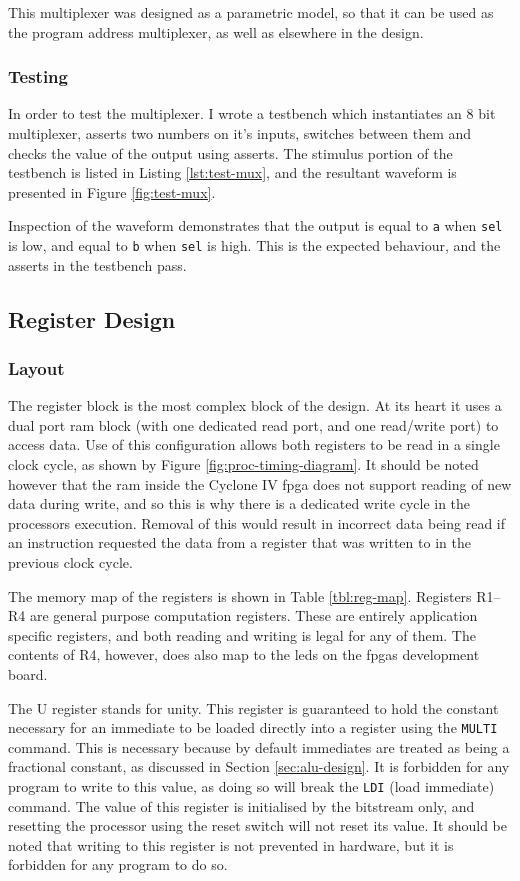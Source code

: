 This multiplexer was designed as a parametric model, so that it can be used as the program address multiplexer, as well as elsewhere in the design.


\subsubsection{Testing}
In order to test the multiplexer. I wrote a testbench which instantiates an $8$ bit multiplexer, asserts two numbers on it's inputs, switches between them and checks the value of the output using asserts. The stimulus portion of the testbench is listed in Listing \ref{lst:test-mux}, and the resultant waveform is presented in Figure \ref{fig:test-mux}.

Inspection of the waveform demonstrates that the output is equal to \texttt{a}  when \texttt{sel} is low, and equal to \texttt{b} when \texttt{sel} is high. This is the expected behaviour, and the asserts in the testbench pass.


\subsection{Register Design}
\subsubsection{Layout}

The register block is the most complex block of the design. At its heart it uses a dual port \gls{ram} block (with one dedicated read port, and one read/write port) to access data. Use of this configuration allows both registers to be read in a single clock cycle, as shown by Figure \ref{fig:proc-timing-diagram}. It should be noted however that the \gls{ram} inside the Cyclone IV \gls{fpga} does not support reading of new data during write, and so this is why there is a dedicated write cycle in the processors execution. Removal of this would result in incorrect data being read if an instruction requested the data from a register that was written to in the previous clock cycle.

The memory map of the registers is shown in Table \ref{tbl:reg-map}. Registers R1--R4 are general purpose computation registers. These are entirely application specific registers, and both reading and writing is legal for any of them. The contents of R4, however, does also map to the \glspl{led} on the \glspl{fpga} development board.

The U register stands for unity. This register is guaranteed to hold the constant necessary for an immediate to be loaded directly into a register using the \texttt{MULTI} command. This is necessary because by default immediates are treated as being a fractional constant, as discussed in Section \ref{sec:alu-design}. It is forbidden for any program to write to this value, as doing so will break the \texttt{LDI} (load immediate) command. The value of this register is initialised by the bitstream only, and resetting the processor using the reset switch will not reset its value. It should be noted that writing to this register is not prevented in hardware, but it is forbidden for any program to do so.

